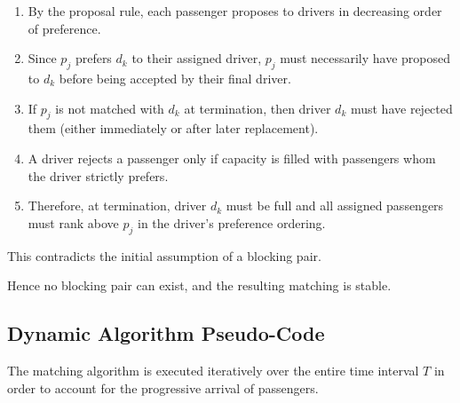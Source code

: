 \documentclass[11pt,a4paper]{article}
\begin{document}
\begin{enumerate}

    \item By the proposal rule, each passenger proposes to drivers in decreasing order of preference.

    \item Since $p_j$ prefers $d_k$ to their assigned driver, $p_j$ must necessarily have proposed to $d_k$ before being accepted by their final driver.

    \item If $p_j$ is not matched with $d_k$ at termination, then driver $d_k$ must have rejected them (either immediately or after later replacement).

    \item A driver rejects a passenger only if capacity is filled with passengers whom the driver strictly prefers.

    \item Therefore, at termination, driver $d_k$ must be full and all assigned passengers must rank above $p_j$ in the driver's preference ordering.

\end{enumerate}

This contradicts the initial assumption of a blocking pair.

Hence no blocking pair can exist, and the resulting matching is stable.


\subsection{Dynamic Algorithm Pseudo-Code}

The matching algorithm is executed iteratively over the entire time interval $T$ in order to account for the progressive arrival of passengers.
\end{document}
